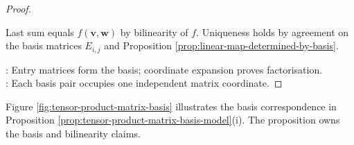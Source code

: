 \begin{proposition}
\begin{proof}
\begin{enumerate}[label=(\roman*)]
Last sum equals $f(\mathbf{v},\mathbf{w})$ by bilinearity of $f$. Uniqueness holds by agreement on the basis matrices $E_{i,j}$ and Proposition \ref{prop:linear-map-determined-by-basis}.
\end{enumerate}
: Entry matrices form the basis; coordinate expansion proves factorisation.\\
: Each basis pair occupies one independent matrix coordinate.
\end{proof}
\end{proposition}

\begin{illustrationfigure}[H]
  \centering
  
  \caption{A basis pair occupies the $(i,j)$ matrix slot.}
  \label{fig:tensor-product-matrix-basis}
\end{illustrationfigure}

Figure \ref{fig:tensor-product-matrix-basis} illustrates the basis correspondence in Proposition \ref{prop:tensor-product-matrix-basis-model}(i). The proposition owns the basis and bilinearity claims.

